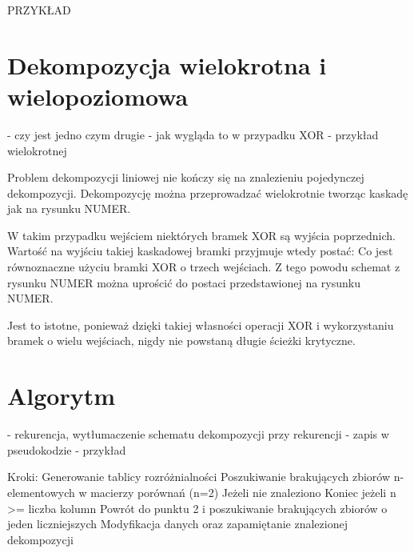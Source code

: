 PRZYKŁAD


\section{Dekompozycja wielokrotna i wielopoziomowa}
	- czy jest jedno czym drugie
	- jak wygląda to w przypadku XOR
	- przykład wielokrotnej

Problem dekompozycji liniowej nie kończy się na znalezieniu pojedynczej dekompozycji. Dekompozycję można przeprowadzać wielokrotnie tworząc kaskadę jak na rysunku NUMER.

W takim przypadku wejściem niektórych bramek XOR są wyjścia poprzednich. Wartość na wyjściu takiej kaskadowej bramki przyjmuje wtedy postać:
Co jest równoznaczne użyciu bramki XOR o trzech wejściach. Z tego powodu schemat z rysunku NUMER można uprościć do postaci przedstawionej na rysunku NUMER.

Jest to istotne, ponieważ dzięki takiej własności operacji XOR i wykorzystaniu bramek o wielu wejściach, nigdy nie powstaną długie ścieżki krytyczne.

\section{Algorytm}
- rekurencja, wytłumaczenie schematu dekompozycji przy rekurencji
- zapis w pseudokodzie
- przykład

Kroki:
Generowanie tablicy rozróżnialności
Poszukiwanie brakujących zbiorów n-elementowych w macierzy porównań (n=2)
Jeżeli nie znaleziono
Koniec jeżeli n >= liczba kolumn
Powrót do punktu 2 i poszukiwanie brakujących zbiorów o jeden liczniejszych
Modyfikacja danych oraz zapamiętanie znalezionej dekompozycji
